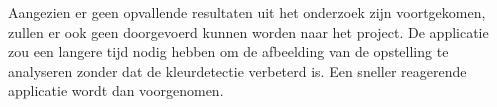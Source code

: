 Aangezien er geen opvallende resultaten uit het onderzoek zijn voortgekomen, zullen er ook geen doorgevoerd kunnen worden naar het project. De applicatie zou een langere tijd nodig hebben om de afbeelding van de opstelling te analyseren zonder dat de kleurdetectie verbeterd is. Een sneller reagerende applicatie wordt dan voorgenomen. 